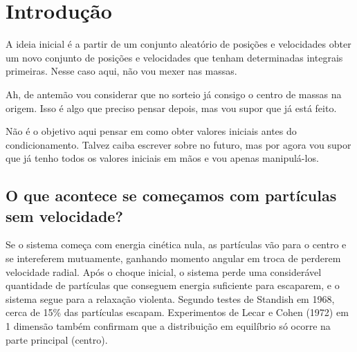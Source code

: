 \section{Introdução}
A ideia inicial é a partir de um conjunto aleatório de posições e velocidades obter um novo conjunto de posições e velocidades que tenham determinadas integrais primeiras. Nesse caso aqui, não vou mexer nas massas.

Ah, de antemão vou considerar que no sorteio já consigo o centro de massas na origem. Isso é algo que preciso pensar depois, mas vou supor que já está feito.

Não é o objetivo aqui pensar em como obter valores iniciais antes do condicionamento. Talvez caiba escrever sobre no futuro, mas por agora vou supor que já tenho todos os valores iniciais em mãos e vou apenas manipulá-los.

\subsection{O que acontece se começamos com partículas sem velocidade?}
Se o sistema começa com energia cinética nula, as partículas vão para o centro e se intereferem mutuamente, ganhando momento angular em troca de perderem velocidade radial. Após o choque inicial, o sistema perde uma considerável quantidade de partículas que conseguem energia suficiente para escaparem, e o sistema segue para a relaxação violenta. Segundo testes de Standish em 1968, cerca de 15\% das partículas escapam. Experimentos de Lecar e Cohen (1972) em 1 dimensão também confirmam que a distribuição em equilíbrio só ocorre na parte principal (centro).

